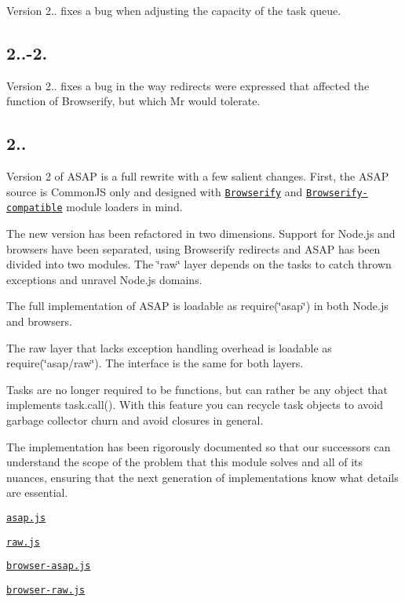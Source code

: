 Version 2.. fixes a bug when adjusting the capacity of the task queue.

\subsection*{2..-\/2.}

Version 2.. fixes a bug in the way redirects were expressed that affected the function of Browserify, but which Mr would tolerate.

\subsection*{2..}

Version 2 of A\+S\+AP is a full rewrite with a few salient changes. First, the A\+S\+AP source is Common\+JS only and designed with \href{https://github.com/substack/node-browserify}{\tt Browserify} and \href{https://github.com/montagejs/mr}{\tt Browserify-\/compatible} module loaders in mind.

The new version has been refactored in two dimensions. Support for Node.\+js and browsers have been separated, using Browserify redirects and A\+S\+AP has been divided into two modules. The \char`\"{}raw\char`\"{} layer depends on the tasks to catch thrown exceptions and unravel Node.\+js domains.

The full implementation of A\+S\+AP is loadable as {\ttfamily require(\char`\"{}asap\char`\"{})} in both Node.\+js and browsers.

The raw layer that lacks exception handling overhead is loadable as {\ttfamily require(\char`\"{}asap/raw\char`\"{})}. The interface is the same for both layers.

Tasks are no longer required to be functions, but can rather be any object that implements {\ttfamily task.\+call()}. With this feature you can recycle task objects to avoid garbage collector churn and avoid closures in general.

The implementation has been rigorously documented so that our successors can understand the scope of the problem that this module solves and all of its nuances, ensuring that the next generation of implementations know what details are essential.


\begin{DoxyItemize}
\item \href{https://github.com/kriskowal/asap/blob/master/asap.js}{\tt asap.\+js}
\item \href{https://github.com/kriskowal/asap/blob/master/raw.js}{\tt raw.\+js}
\item \href{https://github.com/kriskowal/asap/blob/master/browser-asap.js}{\tt browser-\/asap.\+js}
\item \href{https://github.com/kriskowal/asap/blob/master/browser-raw.js}{\tt browser-\/raw.\+js}
\end{DoxyItemize}

